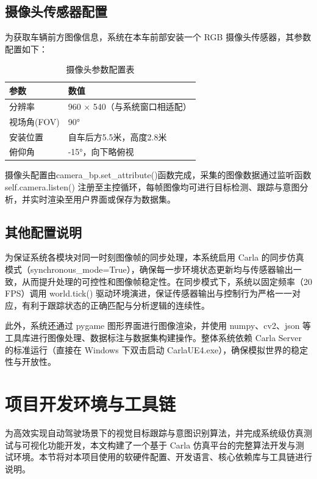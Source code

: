 \subsection{摄像头传感器配置}
为获取车辆前方图像信息，系统在本车前部安装一个 RGB 摄像头传感器，其参数配置如下：
\begin{table}[htbp]
  \caption{摄像头参数配置表}
  \label{tab:camera_params}
  \centering
  \begin{tabular}{ll}
    \toprule
    参数 & 数值 \\
    \midrule
    分辨率 & 960 × 540（与系统窗口相适配） \\
    视场角(FOV) & 90° \\
    安装位置 & 自车后方5.5米，高度2.8米 \\
    俯仰角 & -15°，向下略俯视 \\
    \bottomrule
  \end{tabular}
\end{table}

摄像头配置由camera\_bp.set\_attribute()函数完成，采集的图像数据通过监听函数 self.camera.listen() 注册至主控循环，每帧图像均可进行目标检测、跟踪与意图分析，并实时渲染至用户界面或保存为数据集。

\subsection{其他配置说明}

为保证系统各模块对同一时刻图像帧的同步处理，本系统启用 Carla 的同步仿真模式（synchronous\_mode=True），确保每一步环境状态更新均与传感器输出一致，从而提升处理的可控性和图像帧稳定性。在同步模式下，系统以固定频率（20 FPS）调用 world.tick() 驱动环境演进，保证传感器输出与控制行为严格一一对应，有利于跟踪状态的正确匹配与分析逻辑的连续性。

此外，系统还通过 pygame 图形界面进行图像渲染，并使用 numpy、cv2、json 等工具库进行图像处理、数据标注与数据集构建操作。整体系统依赖 Carla Server 的标准运行（直接在 Windows 下双击启动 CarlaUE4.exe），确保模拟世界的稳定性与开放性。

\section{项目开发环境与工具链}

为高效实现自动驾驶场景下的视觉目标跟踪与意图识别算法，并完成系统级仿真测试与可视化功能开发，本文构建了一个基于 Carla 仿真平台的完整算法开发与测试环境。本节将对本项目使用的软硬件配置、开发语言、核心依赖库与工具链进行说明。

